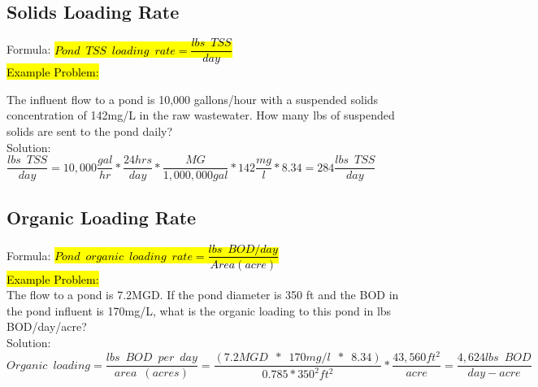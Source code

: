 \subsection{Solids Loading Rate}


Formula: \hl{$Pond \enspace TSS \enspace loading \enspace rate =  \dfrac{lbs \enspace TSS}{day}$}  \\
\vspace{0.3cm}
\hl{Example Problem:}\\
\vspace{0.3cm}

The influent flow to a pond is 10,000 gallons/hour with a suspended solids concentration of 142mg/L in the raw wastewater.  How many lbs of suspended solids are sent to the pond daily?
\\
Solution:\\
\vspace{0.3cm}
$\dfrac{lbs \enspace TSS}{day}=10,000\dfrac{gal}{hr}*\dfrac{24hrs}{day}*\dfrac{MG}{1,000,000gal}*142\dfrac{mg}{l}*8.34=\boxed{284\dfrac{lbs \enspace TSS}{day}}$

\vspace{0.3cm}

\subsection{Organic Loading Rate}

\vspace{0.3cm}
Formula: \hl{$Pond \enspace organic \enspace loading \enspace rate =  \dfrac{lbs \enspace BOD/day}{Area (acre)}$}  \\
\vspace{0.3cm}
\hl{Example Problem:}\\
\vspace{0.3cm}
The flow to a pond is 7.2MGD. If the pond diameter is 350 ft and the BOD in the pond influent is 170mg/L, what is the organic loading to this pond in lbs BOD/day/acre?
\\
Solution:\\
\vspace{0.3cm}
$Organic \enspace loading=\dfrac{lbs \enspace BOD \enspace per \enspace day}{area \enspace (acres)}=\dfrac{(7.2MGD \enspace * \enspace 170mg/l \enspace * \enspace 8.34)}{0.785*350^2ft^2}*\dfrac{43,560ft^2}{acre}=\boxed{\dfrac{4,624lbs \enspace BOD}{day-acre}}$

\vspace{0.3cm}

